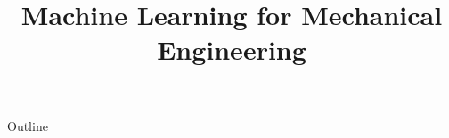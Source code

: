 \documentclass[xcolor=dvipsnames,compress,t,pdf,notes]{beamer}
\title[\insertframenumber /\inserttotalframenumber]{Machine Learning for Mechanical Engineering}
\begin{document}
	\begin{frame}
	\titlepage
	\end{frame}
	
	\begin{frame}{Outline}
	    \tableofcontents
	\end{frame}

	
	
	
\end{document}
